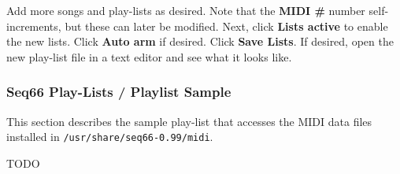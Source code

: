    Add more songs and play-lists as desired.
   Note that the \textbf{MIDI \#} number self-increments, but
   these can later be modified.
   Next, click
   \textbf{Lists active} to enable the new lists.
   Click \textbf{Auto arm} if desired.
   Click \textbf{Save Lists}.
   If desired, open the new play-list file in a text editor
   and see what it looks like.


\subsubsection{Seq66 Play-Lists / Playlist Sample}
\label{subsubsec:playlist_playlist_sample}

   This section describes the sample play-list that accesses the MIDI data
   files installed in
   \texttt{/usr/share/seq66-0.99/midi}.

   TODO

